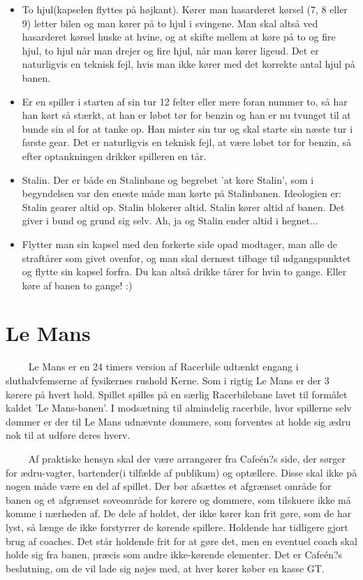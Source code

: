 \documentclass[12pt]{article}
\begin{document}
\begin{itemize}

\item To hjul(kapselen flyttes på højkant). Kører man hasarderet kørsel (7, 8 eller 9) letter bilen og man kører på to hjul i svingene. Man skal altså ved hasarderet kørsel huske at hvine, og at skifte mellem at køre på to og fire hjul, to hjul når man drejer og fire hjul, når man kører ligeud. Det er naturligvis en teknisk fejl, hvis man ikke kører med det korrekte antal hjul på banen.

\item Er en spiller i starten af sin tur 12 felter eller mere foran nummer to, så har han kørt så stærkt, at han er løbet tør for benzin og han er nu tvunget til at bunde sin øl for at tanke op. Han mister sin tur og skal starte sin næste tur i første gear. Det er naturligvis en teknisk fejl, at være løbet tør for benzin, så efter optankningen drikker spilleren en tår.

\item Stalin. Der er både en Stalinbane og begrebet 'at køre Stalin', som i begyndelsen var den eneste måde man kørte på Stalinbanen. Ideologien er: Stalin gearer altid op. Stalin blokerer altid. Stalin kører altid af banen. Det giver i bund og grund sig selv. Ah, ja og Stalin ender altid i hegnet...

\item Flytter man sin kapsel med den forkerte side opad modtager, man alle de straftårer som givet ovenfor, og man skal dernæst tilbage til udgangspunktet og flytte sin kapsel forfra. Du kan altså drikke tårer for hvin to gange. Eller køre af banen to gange! :)

\end{itemize}

\newpage

\section*{Le Mans}

$\qquad$ Le Mans er en 24 timers version af Racerbile udtænkt engang i sluthalvfemserne af fysikernes rushold Kerne. Som i rigtig Le Mans er der 3 kørere på hvert hold. Spillet spilles på en særlig Racerbilebane lavet til formålet kaldet 'Le Mans-banen'. I modsætning til almindelig racerbile, hvor spillerne selv dømmer er der til Le Mans udnævnte dommere, som forventes at holde sig ædru nok til at udføre deres hverv.

$\qquad$ Af praktiske hensyn skal der være arrangører fra Cafeén?s side, der sørger for ædru-vagter, bartender(i tilfælde af publikum) og optællere. Disse skal ikke på nogen måde være en del af spillet. Der bør afsættes et afgrænset område for banen og et afgrænset soveområde for kørere og dommere, som tilskuere ikke må komme i nærheden af. De dele af holdet, der ikke kører kan frit gøre, som de har lyst, så længe de ikke forstyrrer de kørende spillere. Holdende har tidligere gjort brug af coaches. Det står holdende frit for at gøre det, men en eventuel coach skal holde sig fra banen, præcis som andre ikke-kørende elementer. Det er Cafeén?s beslutning, om de vil lade sig nøjes med, at hver kører køber en kasse GT.
\end{document}
